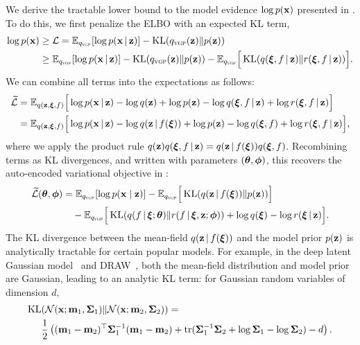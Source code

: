 We derive the tractable lower bound to the model evidence $\log
p(\mbx)$ presented in .
To do this, we first penalize the
\gls{ELBO} with an expected KL term,
\begin{align*}
\log p(\mbx)
&\ge \mathcal{L}
=
\mathbb{E}_{\qvgp}[\log p(\mbx\g\mbz)]
- \operatorname{KL}(\qvgp(\mbz)\|p(\mbz))
\\
&\ge
\mathbb{E}_{\qvgp}[\log p(\mbx\g\mbz)]
- \operatorname{KL}(\qvgp(\mbz)\|p(\mbz))
- \mathbb{E}_{\qvgp}\Big[
\operatorname{KL}(q(\mbxi,f\g\mbz)\|r(\mbxi,f\g\mbz))
\Big].
\end{align*}
We can combine all terms into the expectations as follows:
\begin{align*}
\widetilde{\cL}
&=
\mathbb{E}_{q(\mbz,\mbxi,f)}\Big[
\log p(\mbx\g \mbz) - \log q(\mbz)
+\log p(\mbz)
-
\log q(\mbxi,f\g\mbz) + \log r(\mbxi,f\g\mbz)
\Big]
\\
&=
\mathbb{E}_{q(\mbz,\mbxi,f)}\Big[
\log p(\mbx\g \mbz) - \log q(\mbz\g f(\mbxi))
+\log p(\mbz)
-
\log q(\mbxi,f) + \log r(\mbxi,f\g\mbz)
\Big]
,
\end{align*}
where we apply the product rule
$q(\mbz)q(\mbxi,f\g\mbz)=q(\mbz\g f(\mbxi))q(\mbxi,f)$.
Recombining terms as KL divergences, and written with parameters
$(\mbtheta,\mbphi)$, this recovers the auto-encoded variational
objective in :
\begin{align*}
\widetilde{\cL}(\mbtheta,\mbphi)
&
=
\mathbb{E}_{\qvgp}[\log p(\mbx\mid\mbz)]
-
\mathbb{E}_{\qvgp}\Big[
\operatorname{KL}(q(\mbz\g f(\mbxi))\|p(\mbz))
\Big]
\\
&
\quad
-
\mathbb{E}_{\qvgp}\Big[
\operatorname{KL}(q(f\g\mbxi;\mbtheta)\|r(f\g\mbxi,\mbz;\mbphi))
+
\log q(\mbxi) - \log r(\mbxi\g\mbz)
\Big].
\end{align*}
The KL divergence between the mean-field $q(\mbz\g f(\mbxi))$ and the
model prior $p(\mbz)$ is analytically tractable for certain popular
models.
For example, in the deep latent Gaussian
model~\citep{rezende2014stochastic} and \gls{DRAW}~\citep{gregor2015draw}, both the mean-field
distribution and model prior are Gaussian, leading to an analytic KL
term:
for Gaussian random variables of dimension $d$,
\begin{align*}
\operatorname{KL}&(\mathcal{N}(\mbx; \m_1,\mbSigma_1)\|\mathcal{N}(\mbx; \m_2,\mbSigma_2))
=
\\
&\frac{1}{2}
\left(
(\m_1-\m_2)^\top\mbSigma_1^{-1}(\m_1-\m_2) +
\operatorname{tr}(\mbSigma_1^{-1}\mbSigma_2 + \log{\mbSigma_1} -
\log{\mbSigma_2}) - d\right).
\end{align*}
